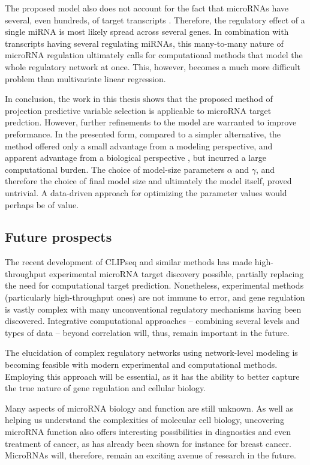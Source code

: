 The proposed model also does not account for the fact that microRNAs have
several, even hundreds, of target transcripts \citep{}. Therefore, the regulatory
effect of a single miRNA is most likely spread across several genes. In
combination with transcripts having several regulating miRNAs, this many-to-many
nature of microRNA regulation ultimately calls for computational methods
that model the whole regulatory network at once. This, however, becomes a much
more difficult problem than multivariate linear regression.

In conclusion, the work in this thesis shows that the proposed method of
projection predictive variable selection is applicable to microRNA target
predction. However, further refinements to the model are warranted to improve
preformance. In the presented form, compared to a simpler alternative, the
method offered only a small advantage from a modeling perspective, and
apparent advantage from a biological perspective , but incurred a large
computational burden. The choice of model-size parameters $\alpha$ and
$\gamma$, and therefore the choice of final model size and ultimately the
model itself, proved untrivial. A data-driven approach for optimizing the
parameter values would perhaps be of value.


\subsection*{Future prospects}

The recent development of CLIPseq and similar methods has made high-throughput
experimental microRNA target discovery possible, partially replacing the need
for computational target prediction. Nonetheless, experimental methods
(particularly high-throughput ones) are not immune to error, and gene
regulation is vastly complex with many unconventional regulatory mechanisms
having been discovered. Integrative computational approaches --
combining several levels and types of data -- beyond correlation will, thus, remain
important in the future.

The elucidation of complex regulatory networks using
network-level modeling is becoming feasible with modern experimental and
computational methods. Employing this approach will be essential, as it has the
ability to better capture the true nature of gene regulation and cellular
biology.

Many aspects of microRNA biology and function are still unknown. As well as
helping us understand the complexities of molecular cell biology, uncovering
microRNA function also offers interesting possibilities in diagnostics and even
treatment of cancer, as has already been shown for instance for breast
cancer. MicroRNAs will, therefore, remain an exciting avenue of research in the future.
